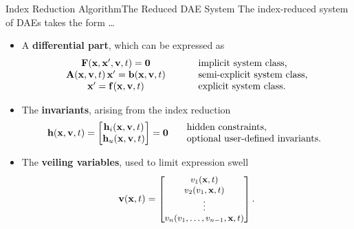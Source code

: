 \begin{frame}{Index Reduction Algorithm}{The Reduced \ac{DAE} System}
  The index-reduced system of \acp{DAE} takes the form \dots
  \begin{itemize}[<+->]
    \item A \textbf{differential part}, which can be expressed as
    \begin{equation*}
      \begin{array}{ccl}
          \mathbf{F}(\mathbf{x}, \mathbf{x}^\prime, \mathbf{v}, t) = \mathbf{0} & \hspace{0.5cm} & \text{implicit  system class,} \\
          \mathbf{A}(\mathbf{x}, \mathbf{v}, t) \, \mathbf{x}^\prime = \mathbf{b}(\mathbf{x}, \mathbf{v}, t) & \hspace{0.5cm} & \text{semi-explicit system class,} \\
          \mathbf{x}^\prime = \mathbf{f}(\mathbf{x}, \mathbf{v}, t) & \hspace{0.5cm} & \text{explicit system class.}
      \end{array}
    \end{equation*}
    \item The \textbf{invariants}, arising from the index reduction
    \begin{equation*}
      \mathbf{h}(\mathbf{x}, \mathbf{v}, t) = \begin{bmatrix}
          \mathbf{h}_{i}(\mathbf{x}, \mathbf{v}, t) \\
          \mathbf{h}_{u}(\mathbf{x}, \mathbf{v}, t)
      \end{bmatrix} = \mathbf{0} \hspace{0.5cm} \begin{array}{l}
        \text{hidden constraints,} \\
        \text{optional user-defined invariants.}
    \end{array}
    \end{equation*}
    \item The \textbf{veiling variables}, used to limit expression swell
    \begin{equation*}
        \mathbf{v}(\mathbf{x}, t) = \mbox{\small\ensuremath{\begin{bmatrix}
            v_{1}(\mathbf{x}, t) \\
            v_{2}(v_{1}, \mathbf{x}, t) \\
            \vdots \\
            v_{n}(v_{1}, \dots, v_{n-1}, \mathbf{x}, t)
        \end{bmatrix}}} \, \text{.}
    \end{equation*}
  \end{itemize}
\end{frame}


